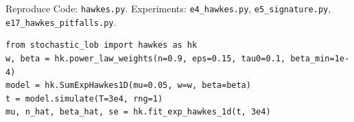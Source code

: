 \documentclass[aspectratio=169,10pt]{beamer}
\begin{document}
\begin{frame}[fragile]{Reproduce}
  \small
  Code: \texttt{hawkes.py}. Experiments: \texttt{e4\_hawkes.py}, \texttt{e5\_signature.py}, \texttt{e17\_hawkes\_pitfalls.py}.
\begin{verbatim}
from stochastic_lob import hawkes as hk
w, beta = hk.power_law_weights(n=0.9, eps=0.15, tau0=0.1, beta_min=1e-4)
model = hk.SumExpHawkes1D(mu=0.05, w=w, beta=beta)
t = model.simulate(T=3e4, rng=1)
mu, n_hat, beta_hat, se = hk.fit_exp_hawkes_1d(t, 3e4)
\end{verbatim}
\end{frame}

\deckreferences
\end{document}
